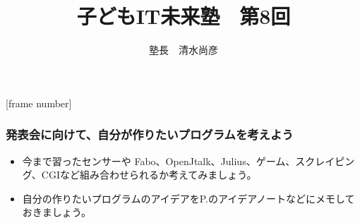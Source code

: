 
\graphicspath{%
{./slide08-img/}%
{./text08-img/}%
}



[frame number]
\title{子どもIT未来塾　第8回}
\author{塾長　清水尚彦}

\def\quiz{1}


\begin{frame}[fragile]
	\frametitle{\large{発表会に向けて、自分が作りたいプログラムを考えよう}~~~}
    \begin{itemize}
        \item 今まで習ったセンサーや Fabo、OpenJtalk、Julius、ゲーム、スクレイピング、CGIなど組み合わせられるか考えてみましょう。
        \item 自分の作りたいプログラムのアイデアをP.\pageref{1:P:challenge}のアイデアノートなどにメモしておきましょう。        
    \end{itemize}
\end{frame}

